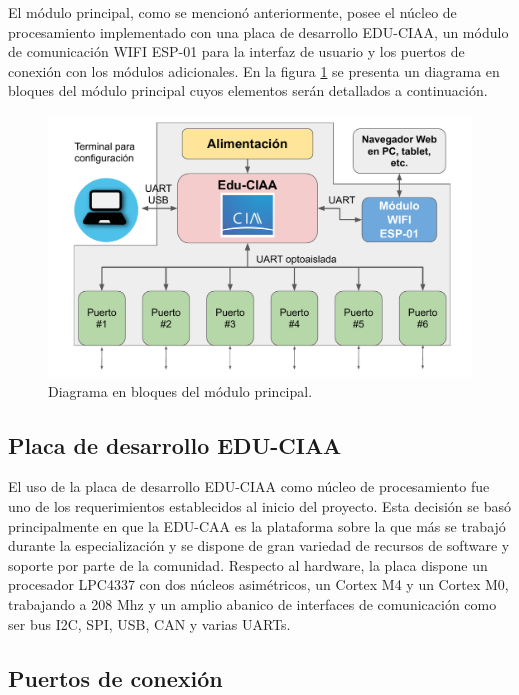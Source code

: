 El módulo principal, como se mencionó anteriormente, posee el núcleo de procesamiento implementado con una placa de desarrollo EDU-CIAA, un módulo de comunicación WIFI ESP-01 para la interfaz de usuario y los puertos de conexión con los módulos adicionales. En la figura \ref{fig:BloquesPrincipal} se presenta un diagrama en bloques del módulo principal cuyos elementos serán detallados a continuación.

\begin{figure}[H]
	\centering
	\includegraphics[width=1\textwidth]{./Figures/bloquesPrincipal.pdf}
	\caption{Diagrama en bloques del módulo principal.}
	\label{fig:BloquesPrincipal}
\end{figure}



\subsection{Placa de desarrollo EDU-CIAA}

El uso de la placa de desarrollo EDU-CIAA como núcleo de procesamiento fue uno de los requerimientos establecidos al inicio del proyecto. Esta decisión se basó principalmente en que la EDU-CAA es la plataforma sobre la que más se trabajó durante la especialización y se dispone de gran variedad de recursos de software y soporte por parte de la comunidad. 
Respecto al hardware, la placa dispone un procesador LPC4337 con dos núcleos asimétricos, un Cortex M4 y un Cortex M0, trabajando a 208 Mhz y un amplio abanico de interfaces de comunicación como ser bus I2C, SPI, USB, CAN y varias UARTs. 


\subsection{Puertos de conexión}

